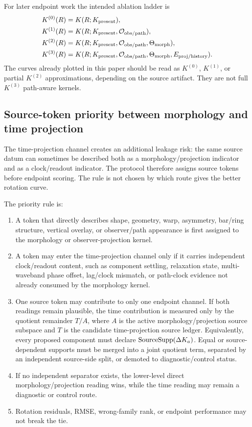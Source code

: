 \documentclass[11pt]{article}
\begin{document}
For later endpoint work the intended ablation ladder is
\begin{align}
  K^{(0)}(R) &= K(R;K_{\rm present}), \\
  K^{(1)}(R) &= K(R;K_{\rm present},{\cal O}_{\rm obs/path}), \\
  K^{(2)}(R) &= K(R;K_{\rm present},{\cal O}_{\rm obs/path},
                      \Theta_{\rm morph}), \\
  K^{(3)}(R) &= K(R;K_{\rm present},{\cal O}_{\rm obs/path},
                      \Theta_{\rm morph},E_{\rm proj/history}) .
  \label{eq:projection-ablation-ladder}
\end{align}
The curves already plotted in this paper should be read as \(K^{(0)}\),
\(K^{(1)}\), or partial \(K^{(2)}\) approximations, depending on the source
artifact.  They are not full \(K^{(3)}\) path-aware kernels.

\subsection{Source-token priority between morphology and time projection}
\label{subsec:source-token-priority}

The time-projection channel creates an additional leakage risk: the same
source datum can sometimes be described both as a morphology/projection
indicator and as a clock/readout indicator.  The protocol therefore assigns
source tokens before endpoint scoring.  The rule is not chosen by which route
gives the better rotation curve.

The priority rule is:
\begin{enumerate}[leftmargin=*]
  \item A token that directly describes shape, geometry, warp, asymmetry,
  bar/ring structure, vertical overlay, or observer/path appearance is first
  assigned to the morphology or observer-projection kernel.
  \item A token may enter the time-projection channel only if it carries
  independent clock/readout content, such as component settling, relaxation
  state, multi-waveband phase offset, lag/clock mismatch, or path-clock
  evidence not already consumed by the morphology kernel.
  \item One source token may contribute to only one endpoint channel.  If both
  readings remain plausible, the time contribution is measured only by the
  quotient remainder \(T/A\), where \(A\) is the active morphology/projection
  source subspace and \(T\) is the candidate time-projection source ledger.
  Equivalently, every proposed component must declare
  \({\rm SourceSupp}(\Delta K_a)\).  Equal or source-dependent supports must be
  merged into a joint quotient term, separated by an independent source-side
  split, or demoted to diagnostic/control status.
  \item If no independent separator exists, the lower-level direct
  morphology/projection reading wins, while the time reading may remain a
  diagnostic or control route.
  \item Rotation residuals, RMSE, wrong-family rank, or endpoint performance
  may not break the tie.
\end{enumerate}
\end{document}
